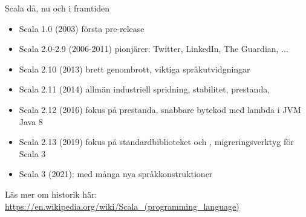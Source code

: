 



\begin{Slide}{Scala då, nu och i framtiden}\SlideFontSmall


\begin{itemize}
\item Scala 1.0 (2003) första pre-release
\item Scala 2.0-2.9 (2006-2011) pionjärer: Twitter, LinkedIn, The Guardian, ...
\item Scala 2.10 (2013) brett genombrott, viktiga språkutvidgningar
\item Scala 2.11 (2014) allmän industriell spridning, stabilitet, prestanda, \\
\item Scala 2.12 (2016) fokus på prestanda, snabbare bytekod med lambda i JVM Java 8
\item Scala 2.13 (2019) fokus på standardbiblioteket och , migreringsverktyg för Scala 3
\item Scala 3 (2021):   med många nya språkkonstruktioner %
\end{itemize}

Läs mer om historik här: \url{https://en.wikipedia.org/wiki/Scala_(programming_language)}
\end{Slide}

